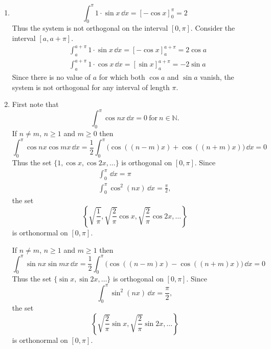 {%
\begin{Solution}
  \begin{enumerate}
  \item
    \[
    \int_0^\pi 1 \cdot \sin x \,\dd x = \left[ - \cos x \right]_0^\pi = 2
    \]
    Thus the system is not orthogonal on the interval $[0,\pi]$.  Consider the
    interval $[a,a+\pi]$.
    \begin{align*}
      &\int_a^{a+\pi} 1 \cdot \sin x \,\dd x 
      = \left[ - \cos x \right]_a^{a+\pi} = 2 \cos a \\
      &\int_a^{a+\pi} 1 \cdot \cos x \,\dd x 
      = \left[ \sin x \right]_a^{a+\pi} = - 2 \sin a 
    \end{align*}
    Since there is no value of $a$ for which both $\cos a$ and $\sin a$ vanish,
    the system is not orthogonal for any interval of length $\pi$.
  \item
    First note that 
    \[
    \int_0^\pi \cos n x \,\dd x = 0\ \mathrm{for}\ n \in \mathbb{N}.
    \]
    If $n \neq m$, $n \geq 1$ and $m \geq 0$ then
    \[
    \int_0^\pi \cos n x \cos m x \,\dd x
    = \frac{1}{2} \int_0^\pi \big( \cos((n-m)x) 
    + \cos((n+m)x) \big) \,\dd x 
    = 0
    \]
    Thus the set $\{1, \cos x, \cos 2x, \ldots \}$ is orthogonal on $[0,\pi]$.
    Since
    \begin{gather*}
      \int_0^\pi \,\dd x = \pi \\
      \int_0^\pi \cos^2(n x) \,\dd x = \frac{\pi}{2},
    \end{gather*}
    the set 
    \[
    \boxed{
      \left\{ \sqrt{ \frac{1}{\pi} }, \sqrt{ \frac{2}{\pi} } \cos x,
        \sqrt{ \frac{2}{\pi} } \cos 2x, \ldots \right\}
      }
    \]
    is orthonormal on $[0,\pi]$.

    If $n \neq m$, $n \geq 1$ and $m \geq 1$ then
    \[
    \int_0^\pi \sin n x \sin m x \,\dd x
    = \frac{1}{2} \int_0^\pi \big( \cos((n-m)x) 
    - \cos((n+m)x) \big) \,\dd x 
    = 0
    \]
    Thus the set $\{\sin x, \sin 2x, \ldots \}$ is orthogonal on $[0,\pi]$.
    Since
    \[
    \int_0^\pi \sin^2(n x) \,\dd x = \frac{\pi}{2},
    \]
    the set 
    \[
    \boxed{
      \left\{ \sqrt{ \frac{2}{\pi} } \sin x,
        \sqrt{ \frac{2}{\pi} } \sin 2x, \ldots \right\}
      }
    \]
    is orthonormal on $[0,\pi]$.
  \end{enumerate}
\end{Solution}






}
